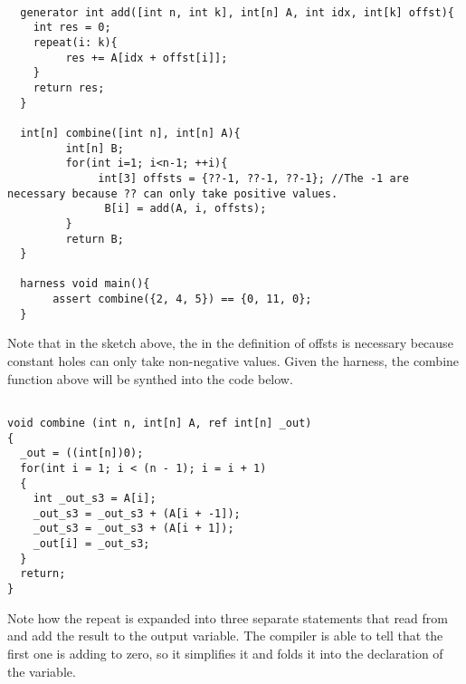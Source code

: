 \begin{lstlisting}

  generator int add([int n, int k], int[n] A, int idx, int[k] offst){
    int res = 0;
    repeat(i: k){ 
         res += A[idx + offst[i]];
    }
    return res;
  }

  int[n] combine([int n], int[n] A){
         int[n] B;
         for(int i=1; i<n-1; ++i){
              int[3] offsts = {??-1, ??-1, ??-1}; //The -1 are necessary because ?? can only take positive values.
               B[i] = add(A, i, offsts);
         }
         return B;
  }

  harness void main(){
       assert combine({2, 4, 5}) == {0, 11, 0};
  }

\end{lstlisting}

Note that in the sketch above, the  in the definition of offsts is necessary because constant holes  can only take non-negative values.
Given the harness, the combine function above will be synthed into the code below.

\begin{lstlisting}

void combine (int n, int[n] A, ref int[n] _out)
{
  _out = ((int[n])0);
  for(int i = 1; i < (n - 1); i = i + 1)
  {
    int _out_s3 = A[i];
    _out_s3 = _out_s3 + (A[i + -1]);
    _out_s3 = _out_s3 + (A[i + 1]);
    _out[i] = _out_s3;
  }
  return;
}

\end{lstlisting}

Note how the repeat is expanded into three separate statements that read from  and add the result to the output variable. The compiler is able to tell that the first one is adding to zero, so it simplifies it and folds it into the declaration of the variable. 


